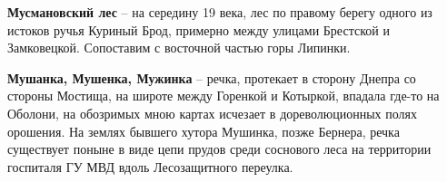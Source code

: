 \medskip

\textbf{Мусмановский лес} – на середину 19 века, лес по правому берегу одного из истоков ручья Куриный Брод, примерно между улицами Брестской и Замковецкой. Сопоставим с восточной частью горы Липинки.\\


\medskip

\textbf{Мушанка, Мушенка, Мужинка} – речка, протекает в сторону Днепра со стороны Мостища, на широте между Горенкой и Котыркой, впадала где-то на Оболони, на обозримых мною картах исчезает в дореволюционных полях орошения. На землях бывшего хутора Мушинка, позже Бернера, речка существует поныне в виде цепи прудов среди соснового леса на территории госпиталя ГУ МВД вдоль Лесозащитного переулка.
